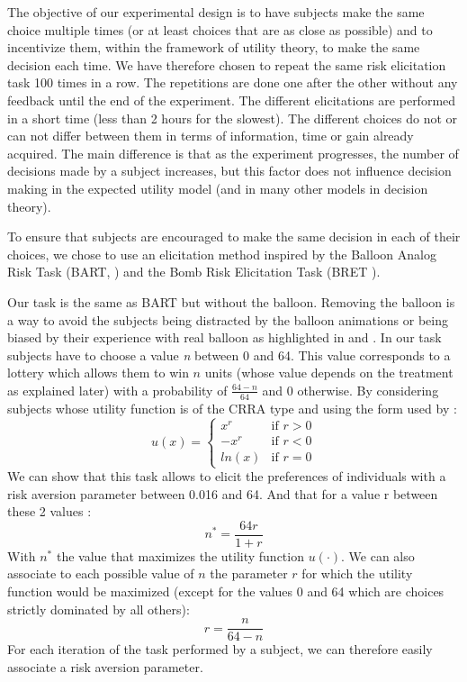 \documentclass[
]{book}
\begin{document}
The objective of our experimental design is to have subjects make the
same choice multiple times (or at least choices that are as close as
possible) and to incentivize them, within the framework of utility
theory, to make the same decision each time. We have therefore chosen to
repeat the same risk elicitation task 100 times in a row. The
repetitions are done one after the other without any feedback until the
end of the experiment. The different elicitations are performed in a
short time (less than 2 hours for the slowest).
The different choices do
not or can not differ between them in terms of information, time or gain
already acquired. The main difference is that as the experiment
progresses, the number of decisions made by a subject increases, but
this factor does not influence decision making in the expected utility
model (and in many other models in decision theory).

To ensure that subjects are encouraged to make the same decision in each
of their choices, we chose to use an elicitation method inspired by the Balloon
Analog Risk Task (BART, \citet{lejuez2002evaluation}) and the Bomb Risk Elicitation
Task (BRET \citet{crosetto2013bomb}).

Our task is the same as BART but without the balloon.
Removing the balloon is a way to avoid the subjects being distracted by the
balloon animations or being biased by their experience with real balloon as
highlighted in \citet{steiner2021representative} and \citet{de2020burst}.
In our task subjects have to choose a value \emph{n} between 0 and 64.
This value corresponds to a lottery which allows them to win \(n\) units (whose
value depends on the treatment as explained later) with a probability of
\(\frac{64 - n}{64}\) and 0 otherwise.
By considering subjects whose utility function is of the CRRA
type and using the form used by \citet{wakker2008explaining}:
\[
u(x) = 
\begin{cases} 
  x^r & \text{if } r>0\\
  -x^r & \text{if } r<0\\
  ln(x) & \text{if } r=0
\end{cases}
\]
We can show that this task allows to elicit the preferences of
individuals with a risk aversion parameter between 0.016 and 64. And
that for a value r between these 2 values :
\[
n^* = \frac{64r}{1 + r}
\]
With \(n^*\) the value that maximizes the utility function \(u(\cdot)\). We can
also associate to each possible value of \(n\) the parameter \(r\) for which
the utility function would be maximized (except for the values 0 and 64
which are choices strictly dominated by all others):
\[
r = \frac{n}{64 - n}
\]
For each iteration of the task performed by a subject, we can
therefore easily associate a risk aversion parameter.
\end{document}
